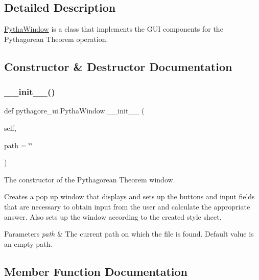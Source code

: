 \subsection{Detailed Description}
\hyperlink{classpythagore__ui_1_1_pytha_window}{Pytha\+Window} is a class that implements the G\+UI components for the Pythagorean Theorem operation. 

\subsection{Constructor \& Destructor Documentation}
\mbox{\label{classpythagore__ui_1_1_pytha_window_a3a9be6ba9c7645923a6e2a9eba16aa23}} 
\subsubsection{\texorpdfstring{\+\_\+\+\_\+init\+\_\+\+\_\+()}{\_\_init\_\_()}}
{\footnotesize\ttfamily def pythagore\+\_\+ui.\+Pytha\+Window.\+\_\+\+\_\+init\+\_\+\+\_\+ (\begin{DoxyParamCaption}\item[{}]{self,  }\item[{}]{path = {\ttfamily \char`\"{}\char`\"{}} }\end{DoxyParamCaption})}



The constructor of the Pythagorean Theorem window. 

Creates a pop up window that displays and sets up the buttons and input fields that are necessary to obtain input from the user and calculate the appropriate answer. Also sets up the window according to the created style sheet. 
\begin{DoxyParams}{Parameters}
{\em path} & The current path on which the file is found. Default value is an empty path. \\
\hline
\end{DoxyParams}


\subsection{Member Function Documentation}
\mbox{\label{classpythagore__ui_1_1_pytha_window_accb4cda1de730c8001b0856b8327700a}} 
